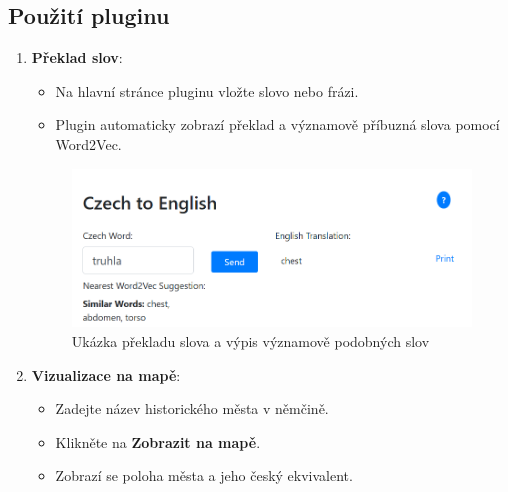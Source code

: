 \documentclass[czech, ba, kiv, he]{fasthesis}
\begin{document}
\subsection{Použití pluginu}

\begin{enumerate}
    \item \textbf{Překlad slov}:
    \begin{itemize}
        \item Na hlavní stránce pluginu vložte slovo nebo frázi.
        \item Plugin automaticky zobrazí překlad a významově příbuzná slova pomocí Word2Vec.
    \end{itemize}
    
    \begin{figure}[H]
        \centering
        \includegraphics[width=1\textwidth]{translation_show.png}
        \caption{Ukázka překladu slova a výpis významově podobných slov}
    \end{figure}
\newpage
    \item \textbf{Vizualizace na mapě}:
    \begin{itemize}
        \item Zadejte název historického města v němčině.
        \item Klikněte na \textbf{Zobrazit na mapě}.
        \item Zobrazí se poloha města a jeho český ekvivalent.
    \end{itemize}


\end{enumerate}
\end{document}
